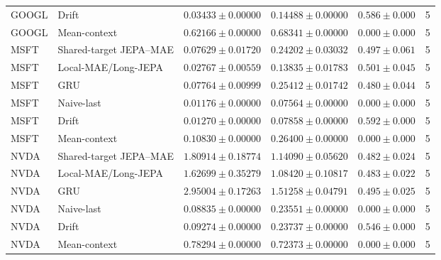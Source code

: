 \begin{longtable}{llrrrr}
GOOGL & Drift & $0.03433 \pm 0.00000$ & $0.14488 \pm 0.00000$ & $0.586 \pm 0.000$ & 5 \\
GOOGL & Mean-context & $0.62166 \pm 0.00000$ & $0.68341 \pm 0.00000$ & $0.000 \pm 0.000$ & 5 \\
MSFT & Shared-target JEPA--MAE & $0.07629 \pm 0.01720$ & $0.24202 \pm 0.03032$ & $0.497 \pm 0.061$ & 5 \\
MSFT & Local-MAE/Long-JEPA & $0.02767 \pm 0.00559$ & $0.13835 \pm 0.01783$ & $0.501 \pm 0.045$ & 5 \\
MSFT & GRU & $0.07764 \pm 0.00999$ & $0.25412 \pm 0.01742$ & $0.480 \pm 0.044$ & 5 \\
MSFT & Naive-last & $0.01176 \pm 0.00000$ & $0.07564 \pm 0.00000$ & $0.000 \pm 0.000$ & 5 \\
MSFT & Drift & $0.01270 \pm 0.00000$ & $0.07858 \pm 0.00000$ & $0.592 \pm 0.000$ & 5 \\
MSFT & Mean-context & $0.10830 \pm 0.00000$ & $0.26400 \pm 0.00000$ & $0.000 \pm 0.000$ & 5 \\
NVDA & Shared-target JEPA--MAE & $1.80914 \pm 0.18774$ & $1.14090 \pm 0.05620$ & $0.482 \pm 0.024$ & 5 \\
NVDA & Local-MAE/Long-JEPA & $1.62699 \pm 0.35279$ & $1.08420 \pm 0.10817$ & $0.483 \pm 0.022$ & 5 \\
NVDA & GRU & $2.95004 \pm 0.17263$ & $1.51258 \pm 0.04791$ & $0.495 \pm 0.025$ & 5 \\
NVDA & Naive-last & $0.08835 \pm 0.00000$ & $0.23551 \pm 0.00000$ & $0.000 \pm 0.000$ & 5 \\
NVDA & Drift & $0.09274 \pm 0.00000$ & $0.23737 \pm 0.00000$ & $0.546 \pm 0.000$ & 5 \\
NVDA & Mean-context & $0.78294 \pm 0.00000$ & $0.72373 \pm 0.00000$ & $0.000 \pm 0.000$ & 5 \\
\bottomrule
\end{longtable}
